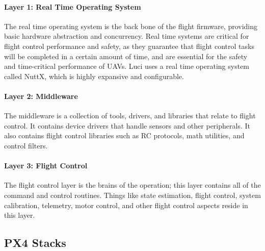 \paragraph{Layer 1: Real Time Operating System\\} %
\label{par:layer_1_real_time_operating_system}
The real time operating system is the back bone of the flight firmware, providing basic hardware abstraction and concurrency. Real time systems are critical for flight control performance and safety, as they guarantee that flight control tasks will be completed in a certain amount of time, and are essential for the safety and time-critical performance of UAVs. Luci uses a real time operating system called NuttX, which is highly expansive and configurable.

\paragraph{Layer 2: Middleware\\} %
\label{par:layer_2_middleware}
The middleware is a collection of tools, drivers, and libraries that relate to flight control. It contains device drivers that handle sensors and other peripherals. It also contains flight control libraries such as RC protocols, math utilities, and control filters.

\paragraph{Layer 3: Flight Control\\} %
\label{par:layer_3_flight_control}
The flight control layer is the brains of the operation; this layer contains all of the command and control routines. Things like state estimation, flight control, system calibration, telemetry, motor control, and other flight control aspects reside in this layer.

\subsection{PX4 Stacks} %
\label{par:avaiable_flight_controller}

